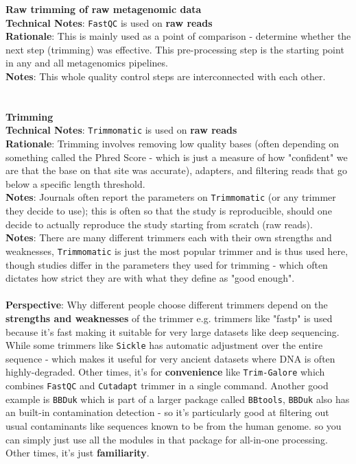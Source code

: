 \documentclass[11pt]{report}
\begin{document}
\textbf{Raw trimming of raw metagenomic data} 
\\ \textbf{Technical Notes}: \texttt{FastQC} is used on \textbf{raw reads}
\\ \textbf{Rationale}: This is mainly used as a point of comparison - determine whether the next step (trimming) was effective. This pre-processing step is the starting point in any and all metagenomics pipelines. 
\\ \textbf{Notes}: This whole quality control steps are interconnected with each other. \\
\\ 
\\
\textbf{Trimming} 
\\ \textbf{Technical Notes}: \texttt{Trimmomatic} is used on \textbf{raw reads}
\\ \textbf{Rationale}: Trimming involves removing low quality bases (often depending on something called the Phred Score - which is just a measure of how "confident" we are that the base on that site was accurate), adapters, and filtering reads that go below a specific length threshold. 
\\ \textbf{Notes}: Journals often report the parameters on \texttt{Trimmomatic} (or any trimmer they decide to use); this is often so that the study is reproducible, should one decide to actually reproduce the study starting from scratch (raw reads). 
\\ \textbf{Notes}: There are many different trimmers each with their own strengths and weaknesses, \texttt{Trimmomatic} is just the most popular trimmer and is thus used here, though studies differ in the parameters they used for trimming - which often dictates how strict they are with what they define as "good enough". \\
\\ \textbf{Perspective}: Why different people choose different trimmers depend on the \textbf{strengths and weaknesses} of the trimmer e.g. trimmers like "fastp" is used because it's fast making it suitable for very large datasets like deep sequencing. While some trimmers like \texttt{Sickle} has automatic adjustment over the entire sequence - which makes it useful for very ancient datasets where DNA is often highly-degraded. Other times, it's for \textbf{convenience} like \texttt{Trim-Galore} which combines \texttt{FastQC} and \texttt{Cutadapt} trimmer in a single command. Another good example is \texttt{BBDuk} which is part of a larger package called \texttt{BBtools}, \texttt{BBDuk} also has an built-in contamination detection - so it's particularly good at filtering out usual contaminants like sequences known to be from the human genome. so you can simply just use all the modules in that package for all-in-one processing.  Other times, it's just \textbf{familiarity}. 
\end{document}
